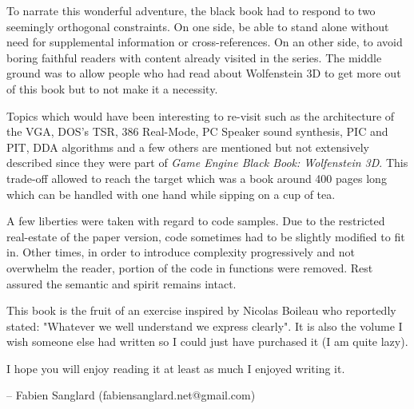  To narrate this wonderful adventure, the black book had to respond to two seemingly orthogonal constraints. On one side,  be able to stand alone without need for supplemental information or cross-references. On an other side, to avoid boring faithful readers with content already visited in the series. The middle ground was to allow people who had read about Wolfenstein 3D to get more out of this book but to not make it a necessity.\\
 \par
 Topics which would have been interesting to re-visit such as the architecture of the VGA, DOS's TSR, 386 Real-Mode, PC Speaker sound synthesis, PIC and PIT, DDA algorithms and a few others are mentioned but not extensively described since they were part of \textit{Game Engine Black Book: Wolfenstein 3D}. This trade-off allowed to reach the target which was a book around 400 pages long which can be handled with one hand while sipping on a cup of tea.\\
\par
A few liberties were taken with regard to code samples. Due to the restricted real-estate of the paper version, code sometimes had to be slightly modified to fit in. Other times, in order to introduce complexity progressively and not overwhelm the reader, portion of the code in functions were removed. Rest assured the semantic and spirit remains intact.\\
\par 
This book is the fruit of an exercise inspired by Nicolas Boileau who reportedly stated: "Whatever we well understand we express clearly". It is also the volume I wish someone else had written so I could just have purchased it (I am quite lazy).\\
\par
I hope you will enjoy reading it at least as much I enjoyed writing it.\\
\par
-- Fabien Sanglard (fabiensanglard.net@gmail.com)
